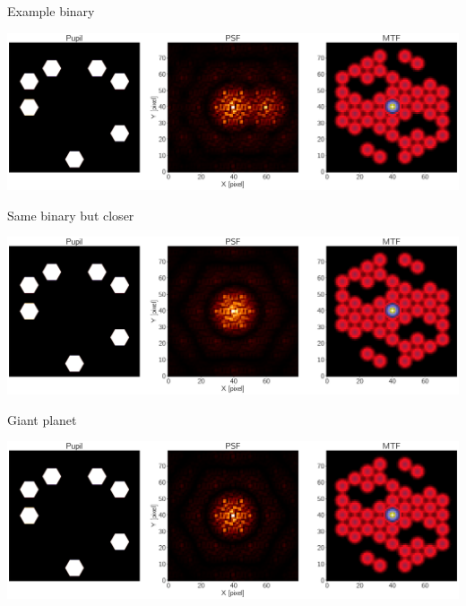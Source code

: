 \documentclass[10pt]{beamer}
\begin{document}
\begin{frame}{Example binary}
  \begin{center}
    \includegraphics[width=\linewidth]{figures/analyse_niriss_ami_bin_sep_20_cr_0.5.pdf}
  \end{center}
\end{frame}
\begin{frame}{Same binary but closer}
  \begin{center}
    \includegraphics[width=\linewidth]{figures/analyse_niriss_ami_bin_sep_2_cr_0.5.pdf}
  \end{center}
\end{frame}
\begin{frame}{Giant planet}
  \begin{center}
    \includegraphics[width=\linewidth]{figures/analyse_niriss_ami_bin_sep_2_cr_0.0001.pdf}
  \end{center}
\end{frame}
\end{document}
